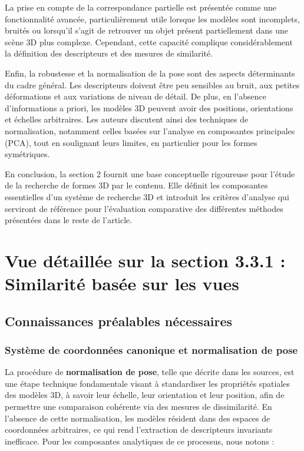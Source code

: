 \documentclass[11pt,a4paper,oneside]{report}
\begin{document}
La prise en compte de la correspondance partielle est présentée comme une fonctionnalité avancée, particulièrement utile lorsque les modèles sont incomplets, bruités ou lorsqu’il s’agit de retrouver un objet présent partiellement dans une scène 3D plus complexe. Cependant, cette capacité complique considérablement la définition des descripteurs et des mesures de similarité.

Enfin, la robustesse et la normalisation de la pose sont des aspects déterminants du cadre général. Les descripteurs doivent être peu sensibles au bruit, aux petites déformations et aux variations de niveau de détail. De plus, en l’absence d’informations a priori, les modèles 3D peuvent avoir des positions, orientations et échelles arbitraires. Les auteurs discutent ainsi des techniques de normalisation, notamment celles basées sur l’analyse en composantes principales (PCA), tout en soulignant leurs limites, en particulier pour les formes symétriques.

En conclusion, la section 2 fournit une base conceptuelle rigoureuse pour l’étude de la recherche de formes 3D par le contenu. Elle définit les composantes essentielles d’un système de recherche 3D et introduit les critères d’analyse qui serviront de référence pour l’évaluation comparative des différentes méthodes présentées dans le reste de l’article.

\section{Vue détaillée sur la section 3.3.1 : Similarité basée sur les vues}

\subsection{Connaissances préalables nécessaires}

\subsubsection{Système de coordonnées canonique et normalisation de pose}

La procédure de \textbf{normalisation de pose}, telle que décrite dans les sources, est une étape technique fondamentale visant à standardiser les propriétés spatiales des modèles 3D, à savoir leur échelle, leur orientation et leur position, afin de permettre une comparaison cohérente via des mesures de dissimilarité. En l'absence de cette normalisation, les modèles résident dans des espaces de coordonnées arbitraires, ce qui rend l'extraction de descripteurs invariants inefficace. Pour les composantes analytiques de ce processus, nous notons :
\end{document}
